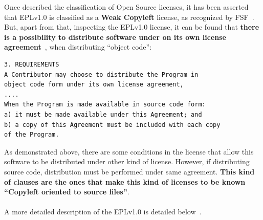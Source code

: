 \documentclass[a4paper, 12pt]{book}
\begin{document}
Once described the classification of Open Source licenses, it has been asserted that EPLv1.0 is classified as a \textbf{Weak Copyleft} license, as recognized by FSF~\cite{FSFEPL}. But, apart from that, inspecting the EPLv1.0 license, it can be found that \textbf{there is a possibility to distribute software under on its own license agreement}~\cite{EPLv1}, when distributing ``object code'':
\begin{verbatim}
3. REQUIREMENTS
A Contributor may choose to distribute the Program in
object code form under its own license agreement,
....
When the Program is made available in source code form:
a) it must be made available under this Agreement; and
b) a copy of this Agreement must be included with each copy
of the Program.
\end{verbatim}
As demonstrated above, there are some conditions in the license that allow this software to be distributed under other kind of license. However, if distributing source code, distribution must be performed under same agreement. \textbf{This kind of clauses are the ones that make this kind of licenses to be known ``Copyleft oriented to source files''}.\\
\\
A more detailed description of the EPLv1.0 is detailed below~\cite{EPLv1overview}.
\end{document}
